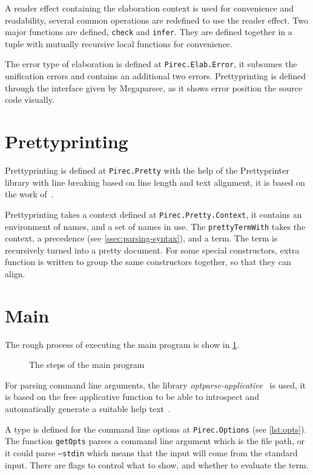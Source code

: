 A reader effect containing the elaboration context is used for convenience and
readability, several common operations are redefined to use the reader effect.
Two major functions are defined, \texttt{check} and
\texttt{infer}. They are defined together in a tuple with mutually
recursive local functions for convenience.

The error type of elaboration is defined at \texttt{Pirec.Elab.Error}, it
subsumes the unification errors and contains an additional two errors.
Prettyprinting is defined through the interface given by Megaparsec, as it shows
error position the source code visually.

\section{Prettyprinting}

Prettyprinting is defined at \texttt{Pirec.Pretty} with the help of the
Prettyprinter~\cite{prettyprinter} library with line breaking based on line length and text alignment, it is based on the work of~\cite{prettier}.

Prettyprinting takes a context defined at \texttt{Pirec.Pretty.Context}, it
contains an environment of names, and a set of names in use. The
\texttt{prettyTermWith} takes the context, a precedence (see
\cref{ssec:parsing-syntax}), and a term. The term is recursively turned into a
pretty document. For some special constructors, extra function is written to
group the same constructors together, so that they can align.

\section{Main}\label{sec:main}

The rough process of executing the main program is show in \cref{fig:main}.

\begin{figure}
  \resizebox{\textwidth}{!}{}
  \caption{The steps of the main program}\label{fig:main}
\end{figure}

For parsing command line arguments, the library
\emph{optparse-applicative}~\cite{optparse} is used, it is based on the free
applicative function to be able to introspect and automatically generate a
suitable help text~\cite{freeapp}.

A type is defined for the command line options at \texttt{Pirec.Options} (see
\cref{lst:opts}). The function \texttt{getOpts} parses a command line
argument which is the file path, or it could parse \texttt{--stdin}
which means that the input will come from the standard input. There are flags to
control what to show, and whether to evaluate the term.

